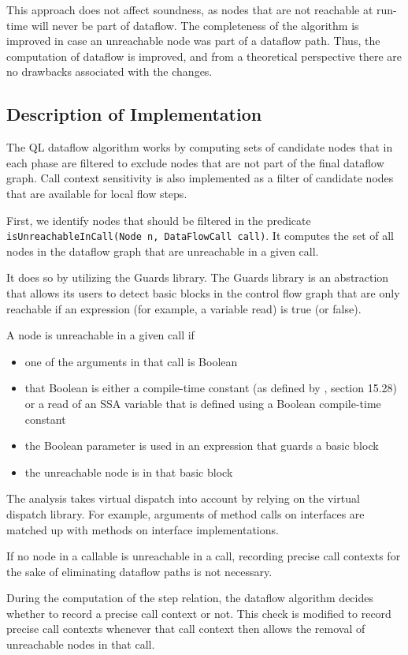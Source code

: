 This approach does not affect soundness,
as nodes that are not reachable at run-time will never be part of dataflow.
The completeness of the algorithm
is improved in case an unreachable node was part of a dataflow path.
Thus, the computation of dataflow is improved, and from a theoretical perspective 
there are no drawbacks associated with the changes.

\subsection{Description of Implementation}
The QL dataflow algorithm works by computing sets of candidate nodes that 
in each phase are filtered to exclude nodes that are not part of the final dataflow graph.
Call context sensitivity is also implemented as a filter of candidate nodes
that are available for local flow steps.

First, we identify nodes that should be filtered in the
predicate \texttt{isUnreachableInCall(Node n, DataFlowCall call)}.
It computes the set of all nodes in the dataflow graph that are unreachable
in a given call.

It does so by utilizing the Guards library.
The Guards library is an abstraction that allows its users to detect 
basic blocks in the control flow graph that are only reachable if an 
expression (for example, a variable read) is true (or false).

A node is unreachable in a given call if
\begin{itemize}
    \item one of the arguments in that call is Boolean
    \item that Boolean is either a compile-time constant (as defined by \cite{jls}, section 15.28)
    or a read of an SSA variable that is defined using a Boolean compile-time constant
    \item the Boolean parameter is used in an expression that guards a basic block
    \item the unreachable node is in that basic block
\end{itemize}
The analysis takes virtual dispatch into account by relying on the virtual
dispatch library.
For example, 
arguments of method calls on interfaces are matched up with methods 
on interface implementations.

If no node in a callable is unreachable in a call, 
recording precise call contexts for the sake of eliminating dataflow paths 
is not necessary.

During the computation of the step relation, the dataflow algorithm 
decides whether to record a precise call context or not.
This check is modified to record precise call contexts whenever that call context 
then allows the removal of unreachable nodes in that call.

